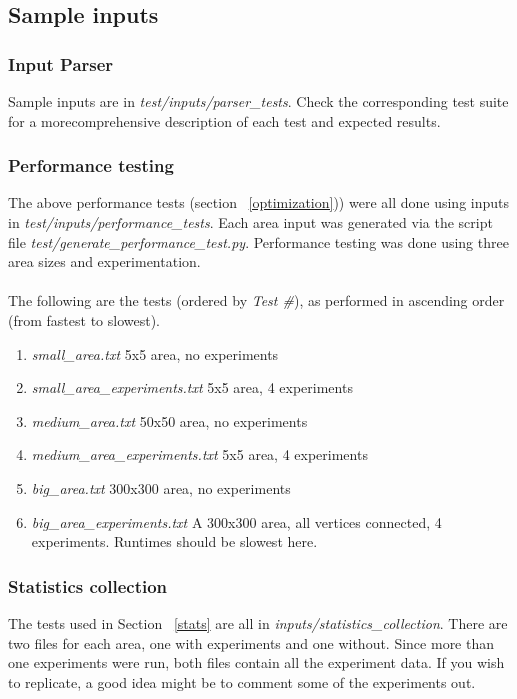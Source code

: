 \documentclass{article}
\begin{document}
		\subsection{Sample inputs}
		\subsubsection{Input Parser}
		Sample inputs are in \textit{test/inputs/parser\_tests}. Check the corresponding test suite for a morecomprehensive description
		of each test and expected results.
	
		\subsubsection{Performance testing} \label{performance}
		The above performance tests (section ~\ref{optimization})) were all done using inputs in \textit{test/inputs/performance\_tests}.
		Each area input was generated via the script file \textit{test/generate\_performance\_test.py}. Performance testing was done
		using three area sizes and experimentation.
		\\
		\\
		The following are the tests (ordered by \textit{Test \#}), as performed in ascending order (from fastest to slowest).
		\begin{enumerate}[start=0]
			\item \textit{small\_area.txt} \- 5x5 area, no experiments
			\item \textit{small\_area\_experiments.txt} \- 5x5 area, 4 experiments
			\item \textit{medium\_area.txt} \- 50x50 area, no experiments
			\item \textit{medium\_area\_experiments.txt} \- 5x5 area, 4 experiments
			\item \textit{big\_area.txt} \- 300x300 area, no experiments
			\item \textit{big\_area\_experiments.txt} \- A 300x300 area, all vertices connected, 4 experiments. Runtimes should be slowest here.
		\end{enumerate}

		\subsubsection{Statistics collection}
		The tests used in Section ~\ref{stats} are all in \textit{inputs/statistics\_collection}. There are two files for each area,
		one with experiments and one without. Since more than one experiments were run, both files contain all the experiment data.
		If you wish to replicate, a good idea might be to comment some of the experiments out.
\end{document}
